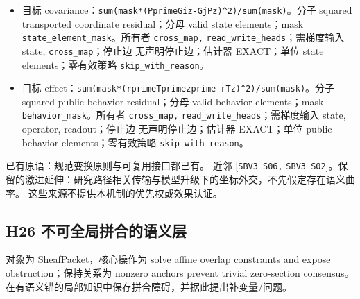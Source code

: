 \documentclass[
  10pt,
]{article}
\begin{document}
\begin{itemize}
\item
  目标
  covariance：{\small\nolinkurl{sum(mask}\hspace{0.333em}\nolinkurl{*}\hspace{0.333em}\nolinkurl{(Pprime}\hspace{0.333em}\nolinkurl{Gi}\hspace{0.333em}\nolinkurl{z}\hspace{0.333em}\nolinkurl{-}\hspace{0.333em}\nolinkurl{Gj}\hspace{0.333em}\nolinkurl{P}\hspace{0.333em}\nolinkurl{z)^2)/sum(mask)}}。分子
  squared transported coordinate residual；分母 valid state
  elements；mask \nolinkurl{state_element_mask}。所有者
  \nolinkurl{cross_map,} \nolinkurl{read_write_heads}；需梯度输入 state,
  \nolinkurl{cross_map}；停止边 无声明停止边；估计器 EXACT；单位 state
  elements；零有效策略 \nolinkurl{skip_with_reason}。
\item
  目标
  effect：{\small\nolinkurl{sum(mask}\hspace{0.333em}\nolinkurl{*}\hspace{0.333em}\nolinkurl{(rprime}\hspace{0.333em}\nolinkurl{Tprime}\hspace{0.333em}\nolinkurl{zprime-r}\hspace{0.333em}\nolinkurl{T}\hspace{0.333em}\nolinkurl{z)^2)/sum(mask)}}。分子
  squared public behavior residual；分母 valid behavior elements；mask
  \nolinkurl{behavior_mask}。所有者 \nolinkurl{cross_map,}
  \nolinkurl{read_write_heads}；需梯度输入 state, operator,
  readout；停止边 无声明停止边；估计器 EXACT；单位 public behavior
  elements；零有效策略 \nolinkurl{skip_with_reason}。
\end{itemize}

已有原语：规范变换原则与可复用接口都已有。 近邻 {[}\nolinkurl{SBV3_S06,}
\nolinkurl{SBV3_S02}{]}。保留的激进延伸：研究路径相关传输与模型升级下的坐标外交，不先假定存在语义曲率。
这些来源不提供本机制的优先权或效果认证。

\subsection{H26
不可全局拼合的语义层}\label{h26-ux4e0dux53efux5168ux5c40ux62fcux5408ux7684ux8bedux4e49ux5c42}

对象为 SheafPacket，核心操作为 solve affine overlap constraints and
expose obstruction；保持关系为 nonzero anchors prevent trivial
zero-section
consensus。在有语义锚的局部知识中保存拼合障碍，并据此提出补变量/问题。
\end{document}
